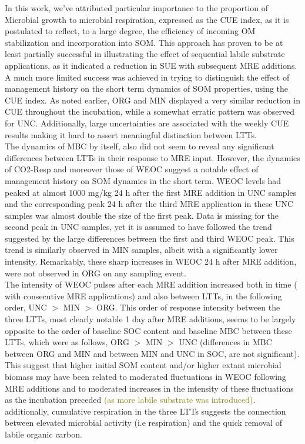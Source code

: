 \documentclass[12pt]{report}
\newcommand{\myGreen}[1]{\textcolor{olive}{#1}} %
\begin{document}
		In this work, we’ve attributed particular importance to the proportion of Microbial growth to microbial respiration, expressed as the CUE index, as it is postulated to reflect, to a large degree, the efficiency of incoming OM stabilization and incorporation into SOM. This approach has proven to be at least partially successful in illustrating the effect of sequential labile substrate applications, as it indicated a reduction in SUE with subsequent MRE additions. A much more limited success was achieved in trying to distinguish the effect of management history on the short term dynamics of SOM properties, using  the CUE index. As noted earlier, ORG and MIN displayed a very similar  reduction in CUE throughout the incubation, while a somewhat erratic pattern was observed for UNC. Additionally, large uncertainties are associated with the weekly CUE results making it hard to assert  meaningful distinction between LTTs.\\
		The dynamics of MBC by itself, also did not seem to reveal any significant differences between LTTs in their response to MRE input.
		However, the dynamics of CO2-Resp and moreover those of WEOC suggest a notable effect of management history on SOM dynamics in the short term. WEOC levels had peaked at almost 1000 mg/kg  24 h after the first MRE addition in UNC samples and the corresponding peak 24 h after the third MRE application in these UNC samples was almost double the size of the first peak. Data is missing for the second peak in UNC samples, yet it is assumed to have followed the trend suggested by the large differences between the first and third WEOC peak. This trend is similarly observed in MIN samples, albeit with a significantly lower intensity. Remarkably, these sharp increases in WEOC 24 h after MRE addition, were not observed in ORG on any sampling event.\\
 		The intensity of WEOC pulses after each MRE addition increased both in time ( with consecutive MRE applications) and also between LTTs, in the following order, UNC $ > $ MIN $ > $ ORG. This order of response intensity between the three LTTs, most clearly notable 1 day after MRE additions, seems to be largely opposite to the order of baseline SOC content and baseline MBC between these LTTs, which were as follows, ORG $ > $ MIN $ > $ UNC (differences in MBC between ORG and MIN and between MIN and UNC in SOC, are not significant). This suggest  that higher initial SOM content and/or higher extant microbial biomass may have been related to moderated fluctuations in WEOC following MRE additions and to moderated increases in the intensity of these fluctuations as the incubation preceded \myGreen{(as more labile substrate was introduced)}. additionally, cumulative respiration in the three LTTs suggests the connection between elevated microbial activity (i.e respiration) and the quick removal of labile organic carbon.\\
\end{document}
